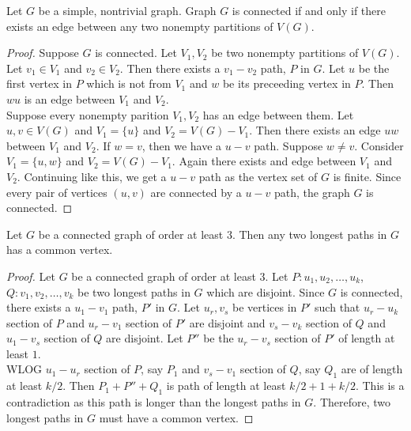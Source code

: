 \begin{exercise}
	Let $G$ be a simple, nontrivial graph.
	Graph $G$ is connected if and only if there exists an edge between any two nonempty partitions of $V(G)$.
\end{exercise}
\begin{proof}
	Suppose $G$ is connected.
	Let $V_1,V_2$ be two nonempty partitions of $V(G)$.
	Let $v_1 \in V_1$ and $v_2 \in V_2$.
	Then there exists a $v_1-v_2$ path, $P$ in $G$.
	Let $u$ be the first vertex in $P$ which is not from $V_1$ and $w$ be its preceeding vertex in $P$. Then $wu$ is an edge between $V_1$ and $V_2$.\\

	Suppose every nonempty parition $V_1,V_2$ has an edge between them.
	Let $u,v \in V(G)$ and $V_1 = \{ u \}$ and $V_2 = V(G)-V_1$. Then there exists an edge $uw$ between $V_1$ and $V_2$. If $w = v$, then we have a $u-v$ path. Suppose $w \ne v$. Consider $V_1 = \{u,w\}$ and $V_2 = V(G)-V_1$. Again there exists and edge between $V_1$ and $V_2$. Continuing like this, we get a $u-v$ path as the vertex set of $G$ is finite. Since every pair of vertices $(u,v)$ are connected by a $u-v$ path, the graph $G$ is connected.
\end{proof}

\begin{exercise}
	Let $G$ be a connected graph of order at least $3$.
	Then any two longest paths in $G$ has a common vertex.
\end{exercise}
\begin{proof}
	Let $G$ be a connected graph of order at least $3$.
	Let $P:u_1,u_2,\dots,u_k$, $Q : v_1,v_2,\dots,v_k$ be two longest paths in $G$ which are disjoint.
	Since $G$ is connected, there exists a $u_1-v_1$ path, $P'$ in $G$.
	Let $u_r,v_s$ be vertices in $P'$ such that $u_r-u_k$ section of $P$ and $u_r-v_1$ section of $P'$ are disjoint and $v_s-v_k$ section of $Q$ and $u_1-v_s$ section of $Q$ are disjoint. Let $P''$ be the $u_r-v_s$ section of $P'$ of length at least $1$. \\

	WLOG $u_1-u_r$ section of $P$, say $P_1$ and $v_s-v_1$ section of $Q$, say $Q_1$ are of length at least $k/2$. Then $P_1 + P''+Q_1$ is path of length at least $k/2+1+k/2$. This is a contradiction as this path is longer than the longest paths in $G$. Therefore, two longest paths in $G$ must have a common vertex.
\end{proof}

